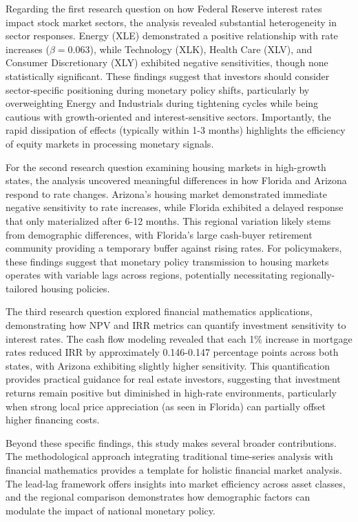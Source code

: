 \documentclass[12pt, stu, abstract]{apa7}
\begin{document}
Regarding the first research question on how Federal Reserve interest rates impact stock market sectors, the analysis revealed substantial heterogeneity in sector responses. Energy (XLE) demonstrated a positive relationship with rate increases ($\beta = 0.063$), while Technology (XLK), Health Care (XLV), and Consumer Discretionary (XLY) exhibited negative sensitivities, though none statistically significant. These findings suggest that investors should consider sector-specific positioning during monetary policy shifts, particularly by overweighting Energy and Industrials during tightening cycles while being cautious with growth-oriented and interest-sensitive sectors. Importantly, the rapid dissipation of effects (typically within 1-3 months) highlights the efficiency of equity markets in processing monetary signals.

For the second research question examining housing markets in high-growth states, the analysis uncovered meaningful differences in how Florida and Arizona respond to rate changes. Arizona's housing market demonstrated immediate negative sensitivity to rate increases, while Florida exhibited a delayed response that only materialized after 6-12 months. This regional variation likely stems from demographic differences, with Florida's large cash-buyer retirement community providing a temporary buffer against rising rates. For policymakers, these findings suggest that monetary policy transmission to housing markets operates with variable lags across regions, potentially necessitating regionally-tailored housing policies.

The third research question explored financial mathematics applications, demonstrating how NPV and IRR metrics can quantify investment sensitivity to interest rates. The cash flow modeling revealed that each 1\% increase in mortgage rates reduced IRR by approximately 0.146-0.147 percentage points across both states, with Arizona exhibiting slightly higher sensitivity. This quantification provides practical guidance for real estate investors, suggesting that investment returns remain positive but diminished in high-rate environments, particularly when strong local price appreciation (as seen in Florida) can partially offset higher financing costs.

Beyond these specific findings, this study makes several broader contributions. The methodological approach integrating traditional time-series analysis with financial mathematics provides a template for holistic financial market analysis. The lead-lag framework offers insights into market efficiency across asset classes, and the regional comparison demonstrates how demographic factors can modulate the impact of national monetary policy.
\end{document}
